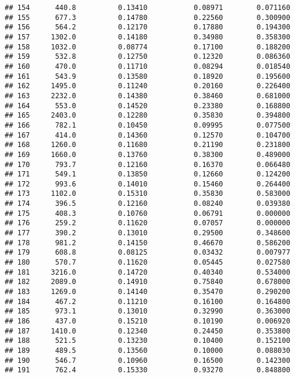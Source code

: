 \documentclass[
]{article}
\begin{document}
\begin{verbatim}
## 154      440.8          0.13410           0.08971        0.071160
## 155      677.3          0.14780           0.22560        0.300900
## 156      564.2          0.12170           0.17880        0.194300
## 157     1302.0          0.14180           0.34980        0.358300
## 158     1032.0          0.08774           0.17100        0.188200
## 159      532.8          0.12750           0.12320        0.086360
## 160      470.0          0.11710           0.08294        0.018540
## 161      543.9          0.13580           0.18920        0.195600
## 162     1495.0          0.11240           0.20160        0.226400
## 163     2232.0          0.14380           0.38460        0.681000
## 164      553.0          0.14520           0.23380        0.168800
## 165     2403.0          0.12280           0.35830        0.394800
## 166      782.1          0.10450           0.09995        0.077500
## 167      414.0          0.14360           0.12570        0.104700
## 168     1260.0          0.11680           0.21190        0.231800
## 169     1660.0          0.13760           0.38300        0.489000
## 170      793.7          0.12160           0.16370        0.066480
## 171      549.1          0.13850           0.12660        0.124200
## 172      993.6          0.14010           0.15460        0.264400
## 173     1102.0          0.15310           0.35830        0.583000
## 174      396.5          0.12160           0.08240        0.039380
## 175      408.3          0.10760           0.06791        0.000000
## 176      259.2          0.11620           0.07057        0.000000
## 177      390.2          0.13010           0.29500        0.348600
## 178      981.2          0.14150           0.46670        0.586200
## 179      608.8          0.08125           0.03432        0.007977
## 180      570.7          0.11620           0.05445        0.027580
## 181     3216.0          0.14720           0.40340        0.534000
## 182     2089.0          0.14910           0.75840        0.678000
## 183     1269.0          0.14140           0.35470        0.290200
## 184      467.2          0.11210           0.16100        0.164800
## 185      973.1          0.13010           0.32990        0.363000
## 186      437.0          0.15210           0.10190        0.006920
## 187     1410.0          0.12340           0.24450        0.353800
## 188      521.5          0.13230           0.10400        0.152100
## 189      489.5          0.13560           0.10000        0.088030
## 190      546.7          0.10960           0.16500        0.142300
## 191      762.4          0.15330           0.93270        0.848800

\end{verbatim}
\end{document}

